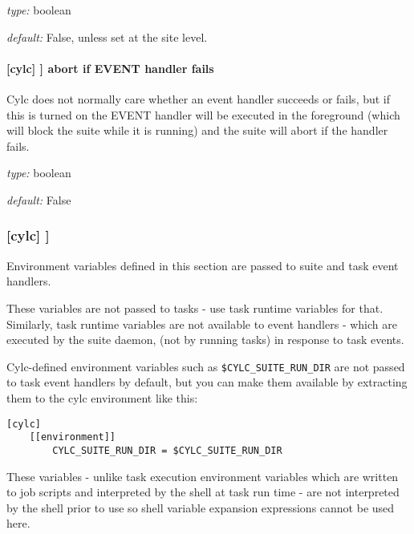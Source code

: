 \begin{myitemize}
    \item {\em type:} boolean
    \item {\em default:} False, unless set at the site level.
\end{myitemize}

\paragraph[abort if startup handler fails]{[cylc] \textrightarrow [[events]] \textrightarrow abort if EVENT handler fails}

Cylc does not normally care whether an event handler succeeds or fails,
but if this is turned on the EVENT handler will be executed in the
foreground (which will block the suite while it is running) and the
suite will abort if the handler fails.

\begin{myitemize}
    \item {\em type:} boolean
    \item {\em default:} False
\end{myitemize}

\subsubsection[{[[}environment{]]} ]{[cylc] \textrightarrow [[environment]]}

Environment variables defined in this section are passed to suite and
task event handlers.

\begin{myitemize}
    \item These variables are not passed to tasks - use task runtime
        variables for that. Similarly, task runtime variables are not
        available to event handlers - which are executed by the suite daemon,
        (not by running tasks) in response to task events.

    \item Cylc-defined environment variables such as
        \lstinline=$CYLC_SUITE_RUN_DIR= are not passed to task event
        handlers by default, but you can make them available by
        extracting them to the cylc environment like this:
\begin{lstlisting}
[cylc]
    [[environment]]
        CYLC_SUITE_RUN_DIR = $CYLC_SUITE_RUN_DIR
\end{lstlisting}

    \item These variables - unlike task execution environment variables
        which are written to job scripts and interpreted by the shell at
        task run time - are not interpreted by the shell prior to use
        so shell variable expansion expressions cannot be used here.
\end{myitemize}

